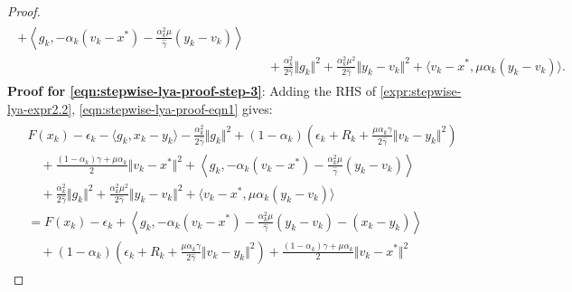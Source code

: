 \documentclass[12pt]{article}
\begin{document}
\begin{proof}
{\begin{align}
\begin{split}
            + 
            \left\langle g_k, 
                - \alpha_k(v_k - x^*) 
                - \frac{\alpha_k^2\mu}{\hat \gamma}(y_k - v_k)
            \right\rangle
            \\
            & \quad 
                + \frac{\alpha_k^2}{2\hat \gamma}\Vert g_k\Vert^2
                + \frac{\alpha_k^2 \mu^2}{2\hat \gamma}\Vert y_k - v_k\Vert^2
                + \langle v_k - x^*, \mu\alpha_k(y_k - v_k)\rangle. 
        \end{split}
        \end{align}
        }
        \textbf{Proof for \eqref{eqn:stepwise-lya-proof-step-3}}: 
        Adding the RHS of \eqref{expr:stepwise-lya-expr2.2}, \eqref{eqn:stepwise-lya-proof-eqn1} gives: 
        \begin{align}\label{eqn:stepwise-lya-proof-eqn3}
            \begin{split}
            &
            F(x_k) - \epsilon_k - \langle  g_k, x_k - y_k\rangle
            - \frac{\alpha_k^2}{2\hat \gamma}\Vert g_k\Vert^2
            + (1 - \alpha_k)
            \left(
                \epsilon_k + R_k + 
                \frac{\mu\alpha_k\gamma}{2\hat \gamma}
                \Vert v_k - y_k\Vert^2
            \right)
            \\
            &\quad 
                + 
                \frac{(1 - \alpha_k)\gamma + \mu \alpha_k}{2} 
                \Vert v_k - x^*\Vert^2
                + 
                \left\langle g_k, 
                    - \alpha_k(v_k - x^*) 
                    - \frac{\alpha_k^2\mu}{\hat \gamma}(y_k - v_k)
                \right\rangle
            \\
            & \quad 
                + \frac{\alpha_k^2}{2\hat \gamma}\Vert g_k\Vert^2
                + \frac{\alpha_k^2 \mu^2}{2\hat \gamma}\Vert y_k - v_k\Vert^2
                + \langle v_k - x^*, \mu\alpha_k(y_k - v_k)\rangle
            \\
            &= 
            F(x_k) - \epsilon_k 
            + \left\langle 
                g_k, 
                - \alpha_k(v_k - x^*) 
                - \frac{\alpha_k^2\mu}{\hat \gamma}(y_k - v_k)
                - (x_k - y_k)
            \right\rangle
            \\
            &\quad 
                + (1 - \alpha_k)
                \left(
                    \epsilon_k + R_k + 
                    \frac{\mu\alpha_k\gamma}{2\hat \gamma}
                    \Vert v_k - y_k\Vert^2
                \right)
                + 
                \frac{(1 - \alpha_k)\gamma + \mu \alpha_k}{2} \Vert v_k - x^*\Vert^2

\end{split}
\end{align}
\end{proof}
\end{document}
